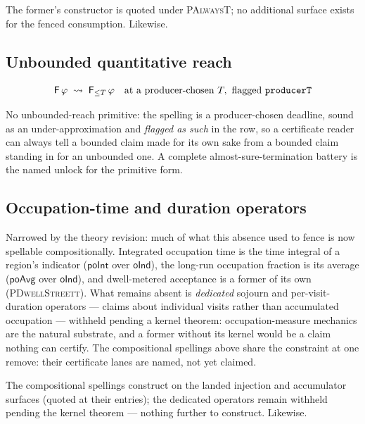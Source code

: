 The former's constructor is quoted under \textsc{PAlwaysT}; no
additional surface exists for the fenced consumption.
Likewise.

\subsection{Unbounded quantitative reach}
\label{sec:spec-lang-funbounded}

\[
\mathsf{F}\,\varphi \;\leadsto\;
\mathsf{F}_{\le T}\,\varphi
\quad\text{at a producer-chosen } T,\ \text{flagged
\texttt{producerT}}
\]

No unbounded-reach primitive: the spelling is a producer-chosen
deadline, sound as an under-approximation and \emph{flagged as such}
in the row, so a certificate reader can always tell a bounded claim
made for its own sake from a bounded claim standing in for an
unbounded one. A complete almost-sure-termination battery is the
named unlock for the primitive form.



\subsection{Occupation-time and duration operators}
\label{sec:spec-lang-focc}


Narrowed by the theory revision: much of what this
absence used to fence is now spellable compositionally. Integrated
occupation time is the time integral of a region's indicator
($\mathsf{poInt}$ over $\mathsf{oInd}$), the long-run occupation
fraction is its average ($\mathsf{poAvg}$ over $\mathsf{oInd}$),
and dwell-metered acceptance is a former of its own
(\textsc{PDwellStreett}). What remains absent is \emph{dedicated}
sojourn and per-visit-duration operators --- claims about
individual visits rather than accumulated occupation --- withheld
pending a kernel theorem: occupation-measure mechanics are the
natural substrate, and a former without its kernel would be a claim
nothing can certify. The compositional spellings above share the
constraint at one remove: their certificate lanes are named, not
yet claimed.

The compositional spellings construct on the landed injection and
accumulator surfaces (quoted at their entries); the dedicated
operators remain withheld pending the kernel theorem --- nothing
further to construct.
Likewise.

